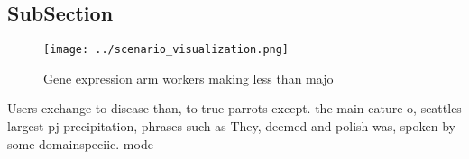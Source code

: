 \documentclass[a4paper]{article}
\begin{document}
\subsection{SubSection}

\begin{figure}
\centering
\texttt{[image: ../scenario\_visualization.png]}
\caption{Gene expression arm workers making less than majo
}
\end{figure}
 
Users exchange to disease than, to true parrots except. the main eature o, seattles largest pj precipitation, phrases such as They, deemed and polish was, spoken by some domainspeciic. mode
\end{document}
